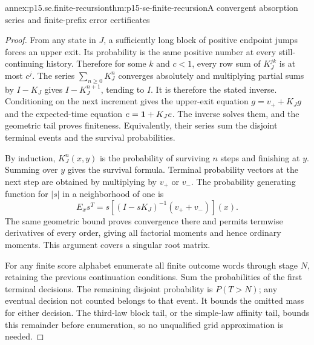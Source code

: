 \begin{annexitem}{annex:p15.se.finite-recursion}{thm:p15-se-finite-recursion}{A convergent absorption series and finite-prefix error certificates}
\begin{proof}
From any state in \(J\), a sufficiently long block of positive endpoint
jumps forces an upper exit. Its probability is the same positive number
at every still-continuing history. Therefore for some \(k\) and
\(c<1\), every row sum of \(K_J^{jk}\) is at most \(c^j\).
The series \(\sum_{n\geq0}K_J^n\) converges absolutely and multiplying
partial sums by \(I-K_J\) gives \(I-K_J^{n+1}\), tending to \(I\).
It is therefore the stated inverse. Conditioning on the next increment
gives the upper-exit equation \(g=v_++K_Jg\) and the expected-time
equation \(e={\bf1}+K_Je\). The inverse solves them, and the geometric
tail proves finiteness. Equivalently, their series sum the disjoint
terminal events and the survival probabilities.

By induction, \(K_J^n(x,y)\) is the probability of surviving \(n\)
steps and finishing at \(y\). Summing over \(y\) gives the survival
formula. Terminal probability vectors at the next step are obtained by
multiplying by \(v_+\) or \(v_-\). The probability generating function
for \(|s|\) in a neighborhood of one is
\[
 E_xs^T=s[(I-sK_J)^{-1}(v_++v_-)](x).
\]
The same geometric bound proves convergence there and permits termwise
derivatives of every order, giving all factorial moments and hence ordinary
moments. This argument covers a singular root matrix.

For any finite score alphabet enumerate all finite outcome words through
stage \(N\), retaining the previous continuation conditions. Sum the
probabilities of the first terminal decisions. The remaining disjoint
probability is \(P(T>N)\); any eventual decision not counted belongs to
that event. It bounds the omitted mass for either decision. The third-law
block tail, or the simple-law affinity tail, bounds this remainder before
enumeration, so no unqualified grid approximation is needed.
\end{proof}
\end{annexitem}

